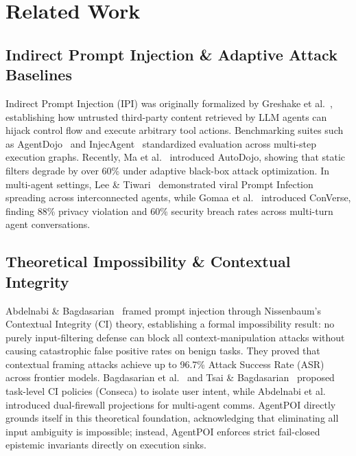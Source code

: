 \section{Related Work}
\label{sec:related_work}

\subsection{Indirect Prompt Injection \& Adaptive Attack Baselines}
Indirect Prompt Injection (IPI) was originally formalized by Greshake et al.~\cite{greshake2023indirect}, establishing how untrusted third-party content retrieved by LLM agents can hijack control flow and execute arbitrary tool actions. Benchmarking suites such as AgentDojo~\cite{debenedetti2024agentdojo} and InjecAgent~\cite{zou2024injecagent} standardized evaluation across multi-step execution graphs. Recently, Ma et al.~\cite{ma2026autodojo} introduced AutoDojo, showing that static filters degrade by over 60\% under adaptive black-box attack optimization. In multi-agent settings, Lee \& Tiwari~\cite{lee2024promptinfection} demonstrated viral Prompt Infection spreading across interconnected agents, while Gomaa et al.~\cite{gomaa2026converse} introduced ConVerse, finding 88\% privacy violation and 60\% security breach rates across multi-turn agent conversations.

\subsection{Theoretical Impossibility \& Contextual Integrity}
Abdelnabi \& Bagdasarian~\cite{abdelnabi2026impossibility} framed prompt injection through Nissenbaum's Contextual Integrity (CI) theory, establishing a formal impossibility result: no purely input-filtering defense can block all context-manipulation attacks without causing catastrophic false positive rates on benign tasks. They proved that contextual framing attacks achieve up to 96.7\% Attack Success Rate (ASR) across frontier models. Bagdasarian et al.~\cite{bagdasarian2024airgapagent} and Tsai \& Bagdasarian~\cite{tsai2025conseca} proposed task-level CI policies (Conseca) to isolate user intent, while Abdelnabi et al.~\cite{abdelnabi2025firewalls} introduced dual-firewall projections for multi-agent comms. AgentPOI directly grounds itself in this theoretical foundation, acknowledging that eliminating all input ambiguity is impossible; instead, AgentPOI enforces strict fail-closed epistemic invariants directly on execution sinks.

